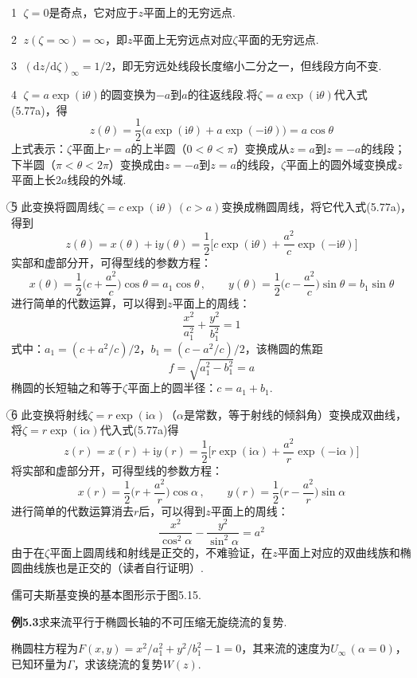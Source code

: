 \textcircled{1} $\zeta=0$是奇点，它对应于$z$平面上的无穷远点.

\textcircled{2} $z(\zeta=\infty)=\infty$，即$z$平面上无穷远点对应$\zeta$平面的无穷远点.

\textcircled{3} $(\mathrm{d}z/\mathrm{d}\zeta)_\infty=1/2$，即无穷远处线段长度缩小二分之一，但线段方向不变.

\textcircled{4} $\zeta=a\exp(\mathrm{i}\theta)$的圆变换为$-a$到$a$的往返线段.将$\zeta=a\exp(\mathrm{i}\theta)$代入式(5.77a)，得
\[
z(\theta)=\frac{1}{2}\big(a\exp(\mathrm{i}\theta)+a\exp(-\mathrm{i}\theta)\big)=a\cos\theta
\]
上式表示：$\zeta$平面上$r=a$的上半圆（$0<\theta<\pi$）变换成从$z=a$到$z=-a$的线段；下半圆（$\pi<\theta<2\pi$）变换成由$z=-a$到$z=a$的线段，$\zeta$平面上的圆外域变换成$z$平面上长$2a$线段的外域.

\textcircled{5} 此变换将圆周线$\zeta=c\exp(\mathrm{i}\theta)\,(c>a)$变换成椭圆周线，将它代入式(5.77a)，得到
\[
z(\theta)=x(\theta)+\mathrm{i}y(\theta)=\frac{1}{2}\bigg[c\exp(\mathrm{i}\theta)+\frac{a^{2}}{c}\exp(-\mathrm{i}\theta)\bigg]
\]
实部和虚部分开，可得型线的参数方程：
\[
x(\theta)=\frac{1}{2}\Big(c+\frac{a^{2}}{c}\Big)\cos\theta=a_1\cos\theta\,,\qquad y(\theta)=\frac{1}{2}\Big(c-\frac{a^{2}}{c}\Big)\sin\theta=b_1\sin\theta
\]
进行简单的代数运算，可以得到$z$平面上的周线：
\[
\frac{x^{2}}{a_1^{2}}+\frac{y^{2}}{b_1^{2}}=1
\]
式中：$a_1=(c+a^{2}/c)/2$，$b_1=(c-a^{2}/c)/2$，该椭圆的焦距
\[
f=\sqrt{a_1^{2}-b_1^{2}}=a
\]
椭圆的长短轴之和等于$\zeta$平面上的圆半径：$c=a_1+b_1$.

\textcircled{6} 此变换将射线$\zeta=r\exp(\mathrm{i}\alpha)$（$\alpha$是常数，等于射线的倾斜角）变换成双曲线，将$\zeta=r\exp(\mathrm{i}\alpha)$代入式(5.77a)得
\[
z(r)=x(r)+\mathrm{i}y(r)=\frac{1}{2}\bigg[r\exp(\mathrm{i}\alpha)+\frac{a^{2}}{r}\exp(-\mathrm{i}\alpha)\bigg]
\]
将实部和虚部分开，可得型线的参数方程：
\[
x(r)=\frac{1}{2}\Big(r+\frac{a^{2}}{r}\Big)\cos\alpha\,,\qquad y(r)=\frac{1}{2}\Big(r-\frac{a^{2}}{r}\Big)\sin\alpha
\]
进行简单的代数运算消去$r$后，可以得到$z$平面上的周线：
\[
\frac{x^{2}}{\cos^{2}\alpha}-\frac{y^{2}}{\sin^{2}\alpha}=a^{2}
\]
由于在$\zeta$平面上圆周线和射线是正交的，不难验证，在$z$平面上对应的双曲线族和椭圆曲线族也是正交的（读者自行证明）.

儒可夫斯基变换的基本图形示于图5.15.

\noindent\textbf{例5.3}\quad 求来流平行于椭圆长轴的不可压缩无旋绕流的复势.

椭圆柱方程为$F(x,y)=x^{2}/a_1^{2}+y^{2}/b_1^{2}-1=0$，其来流的速度为$U_\infty\,(\alpha=0)$，已知环量为$\Gamma$，求该绕流的复势$W(z)$.

